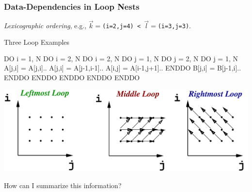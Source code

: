 \documentclass[rgb,dvipsnames]{beamer}
\begin{document}
\begin{frame}[fragile,t]
  \frametitle{Data-Dependencies in Loop Nests} %

{\em Lexicographic ordering}, 
e.g., {\tt$\vec{k}=$(i=2,j=4) < $\vec{l}=$(i=3,j=3)}.

\begin{block}{Three Loop Examples}
\begin{colorcode}
DO i = 1, N          DO i = 2, N              DO i = 2, N
 DO j = 1, N          DO j = 2, N              DO j = 1, N 
  A[j,i] = A[j,i]..    A[j,i] = A[j-1,i-1]..    A[i,j] = A[i-1,j+1]..
 ENDDO                 B[j,i] = B[j-1,i]..     ENDDO
ENDDO                ENDDO ENDDO              ENDDO
\end{colorcode}
\end{block} 
\pause

\hspace{-3ex}\includegraphics[height=20ex]{figures/LoopDeps}  

\alert{How can I summarize this information?} %

\end{frame}
\end{document}
